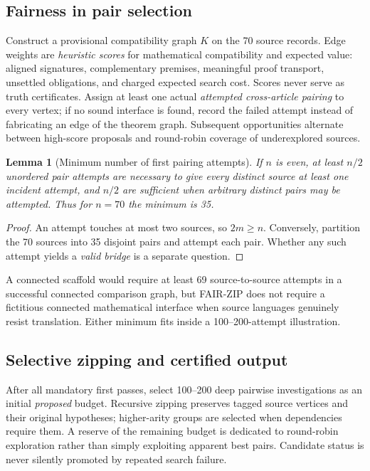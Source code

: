 \documentclass[11pt,letterpaper]{article}
\newtheorem{lemma}[theorem]{Lemma}
\begin{document}
\subsection{Fairness in pair selection}
Construct a provisional compatibility graph $K$ on the 70 source records. Edge weights are \emph{heuristic scores} for mathematical compatibility and expected value: aligned signatures, complementary premises, meaningful proof transport, unsettled obligations, and charged expected search cost. Scores never serve as truth certificates. Assign at least one actual \emph{attempted cross-article pairing} to every vertex; if no sound interface is found, record the failed attempt instead of fabricating an edge of the theorem graph. Subsequent opportunities alternate between high-score proposals and round-robin coverage of underexplored sources.

\begin{lemma}[Minimum number of first pairing attempts]
If $n$ is even, at least $n/2$ unordered pair attempts are necessary to give every distinct source at least one incident attempt, and $n/2$ are sufficient when arbitrary distinct pairs may be attempted. Thus for $n=70$ the minimum is 35.
\end{lemma}
\begin{proof}
An attempt touches at most two sources, so $2m\ge n$. Conversely, partition the 70 sources into 35 disjoint pairs and attempt each pair. Whether any such attempt yields a \emph{valid bridge} is a separate question.
\end{proof}

A connected scaffold would require at least 69 source-to-source attempts in a successful connected comparison graph, but FAIR-ZIP does not require a fictitious connected mathematical interface when source languages genuinely resist translation. Either minimum fits inside a 100--200-attempt illustration.

\subsection{Selective zipping and certified output}
After all mandatory first passes, select 100--200 deep pairwise investigations as an initial \emph{proposed} budget. Recursive zipping preserves tagged source vertices and their original hypotheses; higher-arity groups are selected when dependencies require them. A reserve of the remaining budget is dedicated to round-robin exploration rather than simply exploiting apparent best pairs. Candidate status is never silently promoted by repeated search failure.
\end{document}
